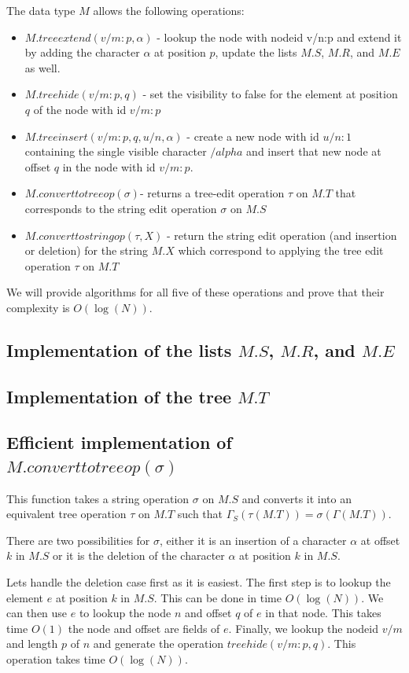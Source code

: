\documentclass{amsart}
\begin{document}
The data type $M$ allows the following operations:
\begin{itemize}
\item $M.treeextend(v/m:p,\alpha)$ - lookup the node with nodeid v/n:p and extend it by adding the character $\alpha$ at position $p$, update the lists $M.S$, $M.R$, and $M.E$ as well.
\item $M.treehide(v/m:p,q)$ - set the visibility to false for the element at position $q$ of the node with id $v/m:p$
\item $M.treeinsert(v/m:p,q,u/n,\alpha)$ - create a new node with id $u/n:1$ containing the single visible character $/alpha$ and insert that new node at offset $q$ in the node with id $v/m:p$.
\item $M.converttotreeop(\sigma)$- returns a tree-edit operation $\tau$ on $M.T$ that corresponds to the string edit operation $\sigma$ on $M.S$
\item $M.converttostringop(\tau,X)$ - return the string edit operation (and insertion or deletion) for the string $M.X$ which correspond to applying the tree edit operation $\tau$ on $M.T$
\end{itemize}
We will provide algorithms for all five of these operations and prove that their complexity is $O(\log(N))$.

\subsection{Implementation of the lists $M.S$, $M.R$, and $M.E$}

\subsection{Implementation of the tree $M.T$}

\subsection{Efficient implementation of $M.converttotreeop(\sigma)$}
This function takes a string operation $\sigma$ on $M.S$ and converts it into
an equivalent tree operation 
$\tau$ on $M.T$ such that
$\Gamma_S(\tau(M.T)) = \sigma(\Gamma(M.T))$.

There are two possibilities for $\sigma$, either it is an insertion of a character $\alpha$ at offset $k$ in $M.S$ or it is the deletion of the character $\alpha$ at position $k$ in $M.S$.  

Lets handle the deletion case first as it is easiest. The first step is to lookup the element $e$ at position $k$ in $M.S$. This can be done in time $O(\log(N))$.
We can then use $e$ to lookup the node $n$ and offset $q$ of $e$ in that node.
This takes time $O(1)$ the node and offset are fields of $e$. Finally, we lookup the
nodeid $v/m$ and length $p$ of $n$ and generate the operation $treehide(v/m:p,q)$. This operation takes time $O(\log(N))$.
\end{document}
